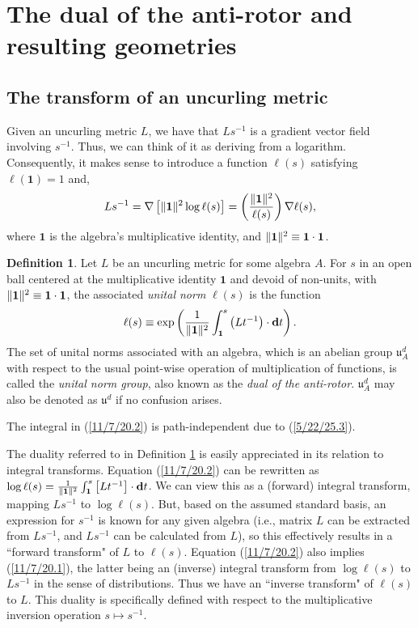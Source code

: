 \documentclass{amsart}
\theoremstyle{definition}
\newtheorem{definition}[theorem]{Definition}
\numberwithin{theorem}{section}
\numberwithin{equation}{section}
\begin{document}
  \section{The dual of the anti-rotor and resulting geometries} 
  \subsection{The transform of an uncurling metric}
  

 Given an uncurling metric $L$, we have that $Ls^{-1}$ is a gradient vector field involving $s^{-1}$.  Thus, we can think of it as deriving from a logarithm.  Consequently, it makes sense to introduce a function $\ell(s)$ satisfying $\ell(\mathbf{1})=1$ and,
  \begin{equation}\label{11/7/20.1} Ls^{-1}  = \nabla\left[\|{\bf 1}\|^2\log  \ell(s)\right] =   \left(\frac{\|{\bf 1}\|^2}{ \ell(s)}\right)\nabla \ell(s),\end{equation} where $\mathbf{1}$ is the algebra's multiplicative identity, and $\|{\bf 1}\|^2 \equiv {\bf 1}\cdot {\bf 1}$. 

   \begin{definition}\label{9/21/23.2} Let $L$ be an uncurling metric for some algebra $A$.  For $s$ in an open ball centered at the multiplicative identity $\mathbf{1}$ and devoid of non-units, with $\|{\bf 1}\|^2 \equiv \mathbf{1}\cdot\mathbf{1}$, the associated {\it unital norm} $ \ell(s)$ is the function 
  \begin{equation}\label{11/7/20.2} \ell(s) \equiv \exp\left(\frac{1}{\|{\bf 1}\|^2}\int_{\bf 1}^s \left(Lt^{-1}\right)\cdot \mathbf{d}t\right).\end{equation} 
   The set of unital norms associated with an algebra, which is an abelian group $\mathfrak{u}^d_A$ with respect to the usual point-wise operation of multiplication of functions, is called the {\it unital norm group}, also known as the {\it dual of the anti-rotor}. $\mathfrak{u}^d_A$ may also be denoted as $\mathfrak{u}^d$ if no confusion arises.  
   \end{definition} 
   
The integral in (\ref{11/7/20.2}) is path-independent due to (\ref{5/22/25.3}).  

The duality referred to in Definition \ref{9/21/23.2} is easily appreciated in its relation to integral transforms.  Equation (\ref{11/7/20.2}) can be rewritten as  \mbox{$\log\ell(s) = \frac{1}{\|\mathbf{1}\|^2}\int_{{\bf 1}}^{s} \left[L t^{-1}\right]\cdot \mathbf{d}t$.}   We can view this as a (forward) integral transform, mapping $Ls^{-1}$ to $\log \ell(s)$.  But, based on the assumed standard basis, an expression for $s^{-1}$ is known for any given algebra (i.e., matrix $L$ can be extracted from $Ls^{-1}$, and $Ls^{-1}$ can be calculated from $L$), so this effectively results in a ``forward transform" of $L$ to $\ell(s)$.    Equation (\ref{11/7/20.2}) also implies (\ref{11/7/20.1}), the latter being an (inverse) integral transform from $\log \ell(s)$ to $Ls^{-1}$ in the sense of distributions.  Thus we have an ``inverse transform" of $\ell(s)$ to $L$.
This duality is specifically defined with respect to the multiplicative inversion operation $s\mapsto s^{-1}$.
   
\end{document}
